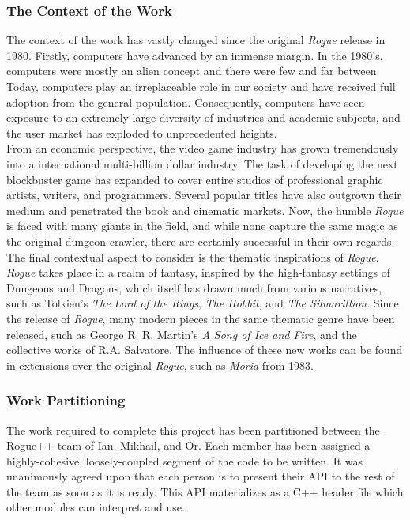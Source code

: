 \documentclass[12pt, titlepage]{article}
\begin{document}
		\subsubsection{The Context of the Work}

		The context of the work has vastly changed since the original \textit{Rogue} release in 1980.  Firstly, computers have advanced by an immense margin.  In the 1980's, computers were mostly an alien concept and there were few and far between.  Today, computers play an irreplaceable role in our society and have received full adoption from the general population.  Consequently, computers have seen exposure to an extremely large diversity of industries and academic subjects, and the user market has exploded to unprecedented heights.\\

		From an economic perspective, the video game industry has grown tremendously into a international multi-billion dollar industry.  The task of developing the next blockbuster game has expanded to cover entire studios of professional graphic artists, writers, and programmers.  Several popular titles have also outgrown their medium and penetrated the book and cinematic markets.  Now, the humble \textit{Rogue} is faced with many giants in the field, and while none capture the same magic as the original dungeon crawler, there are certainly successful in their own regards.\\

		The final contextual aspect to consider is the thematic inspirations of \textit{Rogue}. \textit{Rogue} takes place in a realm of fantasy, inspired by the high-fantasy settings of Dungeons and Dragons, which itself has drawn much from various narratives, such as Tolkien's \textit{The Lord of the Rings}, \textit{The Hobbit}, and \textit{The Silmarillion}.  Since the release of \textit{Rogue}, many modern pieces in the same thematic genre have been released, such as George R. R. Martin's \textit{A Song of Ice and Fire}, and the collective works of R.A. Salvatore.  The influence of these new works can be found in extensions over the original \textit{Rogue}, such as \textit{Moria} from 1983.

		\subsubsection{Work Partitioning}

		The work required to complete this project has been partitioned between the Rogue++ team of Ian, Mikhail, and Or.  Each member has been assigned a highly-cohesive, loosely-coupled segment of the code to be written.  It was unanimously agreed upon that each person is to present their API to the rest of the team as soon as it is ready. This API materializes as a C++ header file which other modules can interpret and use.\\
\end{document}
